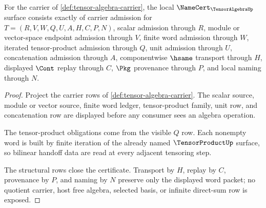 \begin{theorem}
\label{thm:tensor-algebra-namecert-obligations}
For the carrier of \autoref{def:tensor-algebra-carrier}, the local $\NameCert_{\TensorAlgebraUp}$ surface consists exactly of carrier admission for $T=(R,V,W,Q,U,A,H,C,P,N)$, scalar admission through $R$, module or vector-space endpoint admission through $V$, finite word admission through $W$, iterated tensor-product admission through $Q$, unit admission through $U$, concatenation admission through $A$, componentwise $\hsame$ transport through $H$, displayed $\Cont$ replay through $C$, $\Pkg$ provenance through $P$, and local naming through $N$.
\end{theorem}
\begin{proof}
Project the carrier rows of \autoref{def:tensor-algebra-carrier}. The scalar source, module or vector source, finite word ledger, tensor-product family, unit row, and concatenation row are displayed before any consumer sees an algebra operation.

The tensor-product obligations come from the visible $Q$ row. Each nonempty word is built by finite iteration of the already named $\TensorProductUp$ surface, so bilinear handoff data are read at every adjacent tensoring step.

The structural rows close the certificate. Transport by $H$, replay by $C$, provenance by $P$, and naming by $N$ preserve only the displayed word packet; no quotient carrier, host free algebra, selected basis, or infinite direct-sum row is exposed.
\end{proof}

